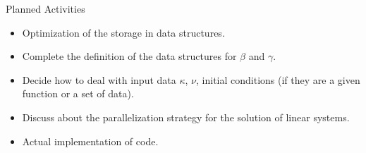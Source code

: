 \documentclass{beamer}
\begin{document}
\begin{frame}{Planned Activities}
    \begin{itemize}
        \item Optimization of the storage in data structures.
        \item Complete the definition of the data structures for $\beta$ and $\gamma$.
        \item Decide how to deal with input data $\kappa$, $\nu$, initial conditions (if they are a given function or a set of data).
        \item Discuss about the parallelization strategy for the solution of linear systems.
        \item Actual implementation of code.
    \end{itemize}
\end{frame}
\end{document}
